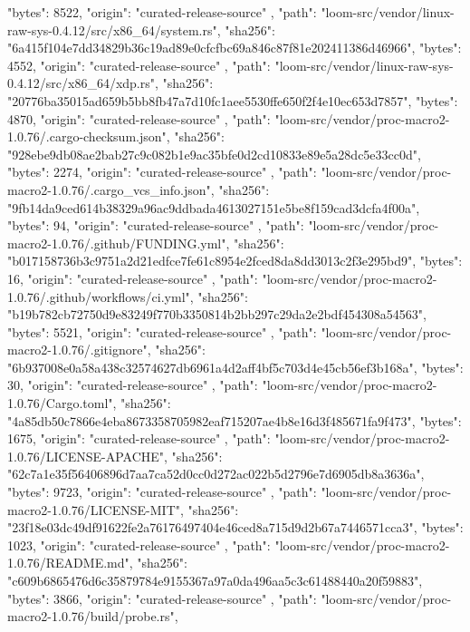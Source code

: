 {{      "bytes": 8522,
      "origin": "curated-release-source"
    },
    {
      "path": "loom-src/vendor/linux-raw-sys-0.4.12/src/x86_64/system.rs",
      "sha256": "6a415f104e7dd34829b36c19ad89e0cfcfbc69a846c87f81e202411386d46966",
      "bytes": 4552,
      "origin": "curated-release-source"
    },
    {
      "path": "loom-src/vendor/linux-raw-sys-0.4.12/src/x86_64/xdp.rs",
      "sha256": "20776ba35015ad659b5bb8fb47a7d10fc1aee5530ffe650f2f4e10ec653d7857",
      "bytes": 4870,
      "origin": "curated-release-source"
    },
    {
      "path": "loom-src/vendor/proc-macro2-1.0.76/.cargo-checksum.json",
      "sha256": "928ebe9db08ae2bab27c9c082b1e9ac35bfe0d2cd10833e89e5a28dc5e33cc0d",
      "bytes": 2274,
      "origin": "curated-release-source"
    },
    {
      "path": "loom-src/vendor/proc-macro2-1.0.76/.cargo_vcs_info.json",
      "sha256": "9fb14da9ced614b38329a96ac9ddbada4613027151e5be8f159cad3dcfa4f00a",
      "bytes": 94,
      "origin": "curated-release-source"
    },
    {
      "path": "loom-src/vendor/proc-macro2-1.0.76/.github/FUNDING.yml",
      "sha256": "b017158736b3c9751a2d21edfce7fe61c8954e2fced8da8dd3013c2f3e295bd9",
      "bytes": 16,
      "origin": "curated-release-source"
    },
    {
      "path": "loom-src/vendor/proc-macro2-1.0.76/.github/workflows/ci.yml",
      "sha256": "b19b782cb72750d9e83249f770b3350814b2bb297c29da2e2bdf454308a54563",
      "bytes": 5521,
      "origin": "curated-release-source"
    },
    {
      "path": "loom-src/vendor/proc-macro2-1.0.76/.gitignore",
      "sha256": "6b937008e0a58a438c32574627db6961a4d2aff4bf5c703d4e45cb56ef3b168a",
      "bytes": 30,
      "origin": "curated-release-source"
    },
    {
      "path": "loom-src/vendor/proc-macro2-1.0.76/Cargo.toml",
      "sha256": "4a85db50c7866e4eba8673358705982eaf715207ae4b8e16d3f485671fa9f473",
      "bytes": 1675,
      "origin": "curated-release-source"
    },
    {
      "path": "loom-src/vendor/proc-macro2-1.0.76/LICENSE-APACHE",
      "sha256": "62c7a1e35f56406896d7aa7ca52d0cc0d272ac022b5d2796e7d6905db8a3636a",
      "bytes": 9723,
      "origin": "curated-release-source"
    },
    {
      "path": "loom-src/vendor/proc-macro2-1.0.76/LICENSE-MIT",
      "sha256": "23f18e03dc49df91622fe2a76176497404e46ced8a715d9d2b67a7446571cca3",
      "bytes": 1023,
      "origin": "curated-release-source"
    },
    {
      "path": "loom-src/vendor/proc-macro2-1.0.76/README.md",
      "sha256": "c609b6865476d6c35879784e9155367a97a0da496aa5c3c61488440a20f59883",
      "bytes": 3866,
      "origin": "curated-release-source"
    },
    {
      "path": "loom-src/vendor/proc-macro2-1.0.76/build/probe.rs",
}}

